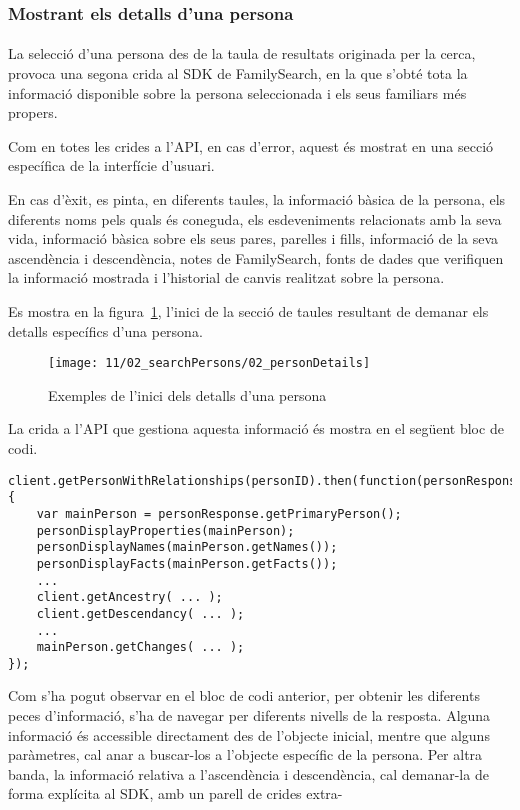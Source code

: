 \subsubsection{Mostrant els detalls d'una persona}

\paragraph{}
La selecció d'una persona des de la taula de resultats originada per la cerca, provoca una segona crida al SDK de FamilySearch, en la que s'obté tota la informació disponible sobre la persona seleccionada i els seus familiars més propers.

Com en totes les crides a l'API, en cas d'error, aquest és mostrat en una secció específica de la interfície d'usuari.

En cas d'èxit, es pinta, en diferents taules, la informació bàsica de la persona, els diferents noms pels quals és coneguda, els esdeveniments relacionats amb la seva vida, informació bàsica sobre els seus pares, parelles i fills, informació de la seva ascendència i descendència, notes de FamilySearch, fonts de dades que verifiquen la informació mostrada i l'historial de canvis realitzat sobre la persona.

Es mostra en la figura~\ref{fig:personSearchDetails}, l'inici de la secció de taules resultant de demanar els detalls específics d'una persona.

\begin{figure}[h]
    \texttt{[image: 11/02\_searchPersons/02\_personDetails]}
    \centering
    \caption{Exemples de l'inici dels detalls d'una persona}\label{fig:personSearchDetails}
\end{figure}

La crida a l'API que gestiona aquesta informació és mostra en el següent bloc de codi.

\begin{lstlisting}[style=rawOwn,caption={Crida al SDK per obtenir tota la informació d'una persona}]
client.getPersonWithRelationships(personID).then(function(personResponse) {
    var mainPerson = personResponse.getPrimaryPerson();
    personDisplayProperties(mainPerson);
    personDisplayNames(mainPerson.getNames());
    personDisplayFacts(mainPerson.getFacts());
    ...
    client.getAncestry( ... );
    client.getDescendancy( ... );
    ...
    mainPerson.getChanges( ... );
});
\end{lstlisting}

Com s'ha pogut observar en el bloc de codi anterior, per obtenir les diferents peces d'informació, s'ha de navegar per diferents nivells de la resposta. Alguna informació és accessible directament des de l'objecte inicial, mentre que alguns paràmetres, cal anar a buscar-los a l'objecte específic de la persona. Per altra banda, la informació relativa a l'ascendència i descendència, cal demanar-la de forma explícita al SDK, amb un parell de crides extra-


